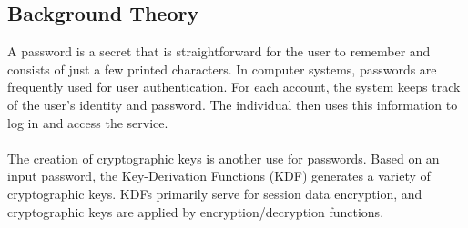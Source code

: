 \documentclass[10pt,oneside,english,a4paper]{article}
\begin{document}
\subsection{Background Theory}
A password is a secret that is straightforward for the user to remember and consists of just a few printed characters. In computer systems, passwords are frequently used for user authentication. For each account, the system keeps track of the user's identity and password. The individual then uses this information to log in and access the service.
\\\\
The creation of cryptographic keys is another use for passwords. Based on an input password, the Key-Derivation Functions (KDF) generates a variety of cryptographic keys. KDFs primarily serve for session data encryption, and cryptographic keys are applied by encryption/decryption functions.
\end{document}
